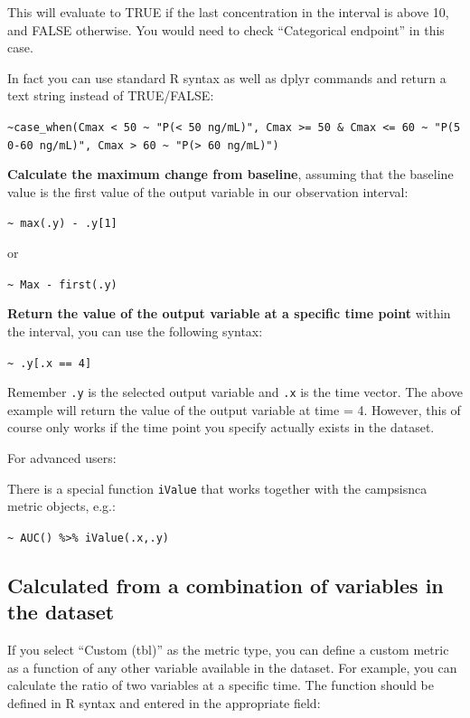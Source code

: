 \documentclass[
]{book}
\begin{document}
This will evaluate to TRUE if the last concentration in the interval is above 10, and FALSE otherwise. You would need to check ``Categorical endpoint'' in this case.

In fact you can use standard R syntax as well as dplyr commands and return a text string instead of TRUE/FALSE:

\texttt{\textasciitilde{}case\_when(Cmax\ \textless{}\ 50\ \textasciitilde{}\ "P(\textless{}\ 50\ ng/mL)",\ Cmax\ \textgreater{}=\ 50\ \&\ Cmax\ \textless{}=\ 60\ \textasciitilde{}\ "P(50-60\ ng/mL)",\ Cmax\ \textgreater{}\ 60\ \textasciitilde{}\ "P(\textgreater{}\ 60\ ng/mL)")}

\textbf{Calculate the maximum change from baseline}, assuming that the baseline value is the first value of the output variable in our observation interval:

\texttt{\textasciitilde{}\ max(.y)\ -\ .y{[}1{]}}

or

\texttt{\textasciitilde{}\ Max\ -\ first(.y)}

\textbf{Return the value of the output variable at a specific time point} within the interval, you can use the following syntax:

\texttt{\textasciitilde{}\ .y{[}.x\ ==\ 4{]}}

Remember \texttt{.y} is the selected output variable and \texttt{.x} is the time vector. The above example will return the value of the output variable at time = 4. However, this of course only works if the time point you specify actually exists in the dataset.

For advanced users:

There is a special function \texttt{iValue} that works together with the campsisnca metric objects, e.g.:

\texttt{\textasciitilde{}\ AUC()\ \%\textgreater{}\%\ iValue(.x,.y)}

\subsection{Calculated from a combination of variables in the dataset}\label{calculated-from-a-combination-of-variables-in-the-dataset}

If you select ``Custom (tbl)'' as the metric type, you can define a custom metric as a function of any other variable available in the dataset. For example, you can calculate the ratio of two variables at a specific time. The function should be defined in R syntax and entered in the appropriate field:
\end{document}
